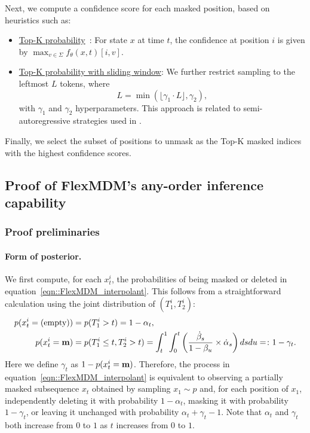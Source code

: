 Next, we compute a confidence score for each masked position, based on heuristics such as:
\begin{itemize}[leftmargin=*,itemsep=0pt,topsep=0pt]
    \item \underline{Top-K probability}~\citep{chang2022maskgit,zheng2024masked}: For state $x$ at time $t$, the confidence at position $i$ is given by $\max_{v \in \Sigma} f_\theta(x, t)[i,v]$.
    \item \underline{Top-K probability with sliding window}: We further restrict sampling to the leftmost $L$ tokens, where
    \[
    L = \min(\lfloor \gamma_1 \cdot L \rfloor, \gamma_2),
    \]
    with $\gamma_1$ and $\gamma_2$ hyperparameters. This approach is related to semi-autoregressive strategies used in \citet{nie2025large}.
\end{itemize}

Finally, we select the subset of positions to unmask as the Top-K masked indices with the highest confidence scores.


\subsection{Proof of FlexMDM's any-order inference capability}
\subsubsection{Proof preliminaries} \label{sec:appendix_unmasking_posterior}
\paragraph{Form of posterior.}
We first compute, for each $x_t^i$, the probabilities of being masked or deleted in equation~\eqref{eqn::FlexMDM_interpolant}. This follows from a straightforward calculation using the joint distribution of $(T_1^i,T_2^i)$:
\begin{align*}
    p(x_t^i=\text{(empty)}) &= p(T_1^i>t) = 1-\alpha_t, \\
    p(x_t^i=\mathbf{m}) &= p(T_1^i \le t, T_2^i>t) =\int_{t}^1 \int_{0}^t\left( \frac{\dot{\beta}_s}{1-\beta_u} \times \dot{\alpha}_s\right) ds du =\colon 1-\gamma_t  .
\end{align*}
Here we define $\gamma_t$ as $1-p(x_t^i=\mathbf{m})$. Therefore, the process in equation~\eqref{eqn::FlexMDM_interpolant} is equivalent to observing a partially masked subsequence $x_t$ obtained by sampling $x_1 \sim p$ and, for each position of $x_1$, independently deleting it with probability $1-\alpha_t$, masking it with probability $1-\gamma_t$, or leaving it unchanged with probability $\alpha_t+\gamma_t-1$. Note that $\alpha_t$ and $\gamma_t$ both increase from $0$ to $1$ as $t$ increases from $0$ to $1$.

